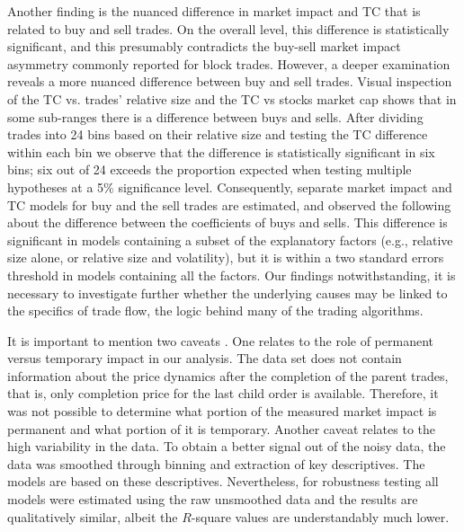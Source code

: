 Another finding is the nuanced difference in market impact and TC that is related to buy and sell trades. On the overall level, this difference is statistically significant, and this presumably contradicts the buy-sell market impact asymmetry commonly reported for block trades. However, a deeper examination reveals a more nuanced difference between buy and sell trades. Visual inspection of the TC vs. trades' relative size and the TC vs stocks market cap shows that in some sub-ranges there is a difference between buys and sells. After dividing trades into 24 bins based on their relative size and testing the TC difference within each bin we observe that the difference is statistically significant in six bins; six out of 24 exceeds the proportion expected when testing multiple hypotheses at a 5\% significance level. Consequently, separate market impact and TC models for buy and the sell trades are estimated, and observed the following about the difference between the coefficients of buys and sells. This difference is significant in models containing a subset of the explanatory factors (e.g., relative size alone, or relative size and volatility), but it is within a two standard errors threshold in models containing all the factors. Our findings notwithstanding, it is necessary to investigate further whether the underlying causes may be linked to the specifics of trade flow, the logic behind many of the trading algorithms.


It is important to mention two caveats . One relates to the role of permanent versus temporary impact in our analysis. The data set does not contain information about the price dynamics after the completion of the parent trades, that is, only completion price for the last child order is available. Therefore, it was not possible to determine what portion of the measured market impact is permanent and what portion of it is temporary. Another caveat relates to the high variability in the data. To obtain a better signal out of the noisy data, the data was smoothed through binning and extraction of key descriptives. The models are based on these descriptives. Nevertheless, for robustness testing all models were estimated using the raw unsmoothed data and the results are qualitatively similar, albeit the $R$-square values are understandably much lower. \\


